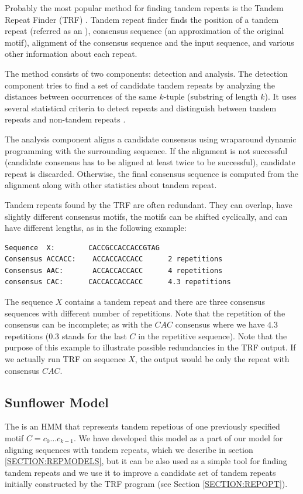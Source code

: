 Probably the most popular method for finding tandem repeats is the Tandem
Repeat Finder (TRF) \cite{Benson1999}.  Tandem repeat finder finds the position
of a tandem repeat (referred as an ), consensus sequence
(an approximation of the original motif), alignment of the consensus sequence
and the input sequence, and various other information about each repeat.

The method consists of two components: detection and analysis. The detection
component tries to find a set of candidate tandem repeats by analyzing the
distances between occurrences of the same $k$-tuple (substring of length $k$).
It uses several statistical criteria to detect repeats and distinguish between
tandem repeats and non-tandem repeats \cite{Benson1999}.

The analysis component aligns a candidate consensus using wraparound dynamic
programming \cite{Myers1989} with the surrounding sequence. If the alignment is
not successful (candidate consensus has to be aligned at least twice to be
successful), candidate repeat is discarded. Otherwise, the final consensus
sequence is computed from the alignment along with other statistics about
tandem repeat.

Tandem repeats found by the TRF are often redundant.  They can overlap, have slightly
different consensus motifs, the motifs can be shifted cyclically, and can have
different lengths, as in the following example:

\begin{verbatim}
Sequence  X:        CACCGCCACCACCGTAG
Consensus ACCACC:    ACCACCACCACC      2 repetitions
Consensus AAC:       ACCACCACCACC      4 repetitions
consensus CAC:      CACCACCACCACC      4.3 repetitions
\end{verbatim}

The sequence $X$ contains a tandem repeat and there are three consensus
sequences with different number of repetitions. Note that the repetition of the
consensus can be incomplete; as with the $CAC$ consensus where we have $4.3$
repetitions ($0.3$ stands for the last $C$ in the repetitive sequence).  Note
that the purpose of this example to illustrate possible redundancies in the TRF
output.  If we actually run TRF on sequence $X$, the output would be only the
repeat with consensus $CAC$.

\subsection{Sunflower Model}\label{SECTION:SUNFLOWERMODEL}
The  is an HMM that represents tandem repetious of
one previously specified motif $C=c_0\dots c_{k-1}$. We have developed this
model as a part of our model for aligning sequences with tandem repeats, which
we describe in section \ref{SECTION:REPMODELS}, but it can be also used as a
simple tool for finding tandem repeats and we use it to improve a candidate set
of tandem repeats initially constructed by the TRF program (see Section
\ref{SECTION:REPOPT}).


